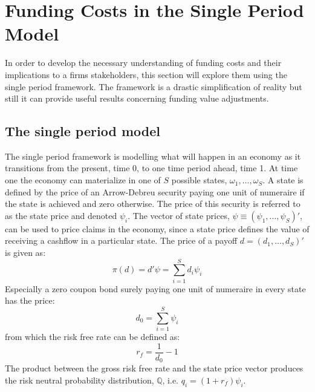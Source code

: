 \documentclass[../main.tex]{subfiles}
\begin{document}
    \section{Funding Costs in the Single Period Model}
        In order to develop the necessary understanding of funding costs and their implications to a firms stakeholders, this section will explore them using the single period framework. The framework is a drastic simplification of reality but still it can provide useful results concerning funding value adjustments.

    \subsection{The single period model}
        The single period framework is modelling what will happen in an economy as it transitions from the present, time 0, to one time period ahead, time 1. At time one the economy can materialize in one of $S$ possible states, $\omega_{1}, \dots, \omega_{S}$. A state is defined by the price of an Arrow-Debreu security paying one unit of numeraire if the state is achieved and zero otherwise. The price of this security is referred to as the state price and denoted $\psi_{i}$. The vector of state prices, $\psi \equiv \left(\psi_{1}, \dots, \psi_{S}\right)'$, can be used to price claims in the economy, since a state price defines the value of receiving a cashflow in a particular state. The price of a payoff $d=\left(d_{1}, \dots, d_{S}\right)'$ is given as:
            \begin{equation}
                \pi(d) = d'\psi = \sum_{i=1}^{S} d_{i}\psi_{i}
            \end{equation}
        Especially a zero coupon bond surely paying one unit of numeraire in every state has the price:
            \begin{equation}
                d_{0} = \sum_{i=1}^{S} \psi_{i}
            \end{equation}
        from which the risk free rate can be defined as:
            \begin{equation}
                r_{f} = \frac{1}{d_{0}} - 1
            \end{equation}
        The product between the gross risk free rate and the state price vector produces the risk neutral probability distribution, $\mathbb{Q}$, i.e. $q_{i} = (1 + r_{f})\psi_{i}$.
\end{document}
